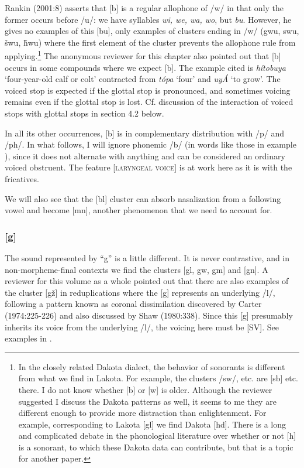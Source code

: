 \documentclass[output=paper]{LSP/langsci}
\begin{document}
Rankin (2001:8) asserts that [b] is a regular allophone of /w/ in that only the former occurs before /u/: we have syllables \textit{wi, we, wa, wo}, but \textit{bu}. However, he gives no examples of this [bu], only examples of clusters ending in /w/ (gwu, swu, \v{s}wu, \v{h}wu) where the first element of the cluster prevents the allophone rule from applying.\footnote{In the closely related Dakota dialect, the behavior of sonorants is different from what we find in Lakota. For example, the clusters /sw/, etc. are [sb] etc. there. I do not know whether [b] or [w] is older. Although the reviewer suggested I discuss the Dakota patterns as well, it seems to me they are different enough to provide more distraction than enlightenment. For example, corresponding to Lakota [gl] we find Dakota [hd]. There is a long and complicated debate in the phonological literature over whether or not [h] is a sonorant, to which these Dakota data can contribute, but that is a topic for another paper.} The anonymous reviewer for this chapter also pointed out that [b] occurs in some compounds where we expect [b]. The example cited is \textit{h\'itobuya} `four-year-old calf or colt' contracted from \textit{t\'opa} `four' and \textit{uy\'A} `to grow'. The voiced stop is expected if the glottal stop is pronounced, and sometimes voicing remains even if the glottal stop is lost. Cf. discussion of the interaction of voiced stops with glottal stops in section 4.2 below.

In all its other occurrences, [b] is in complementary distribution with /p/ and /ph/. In what follows, I will ignore phonemic /b/ (in words like those in example ), since it does not alternate with anything and can be considered an ordinary voiced obstruent. The feature [\textsc{laryngeal voice}] is at work here as it is with the fricatives.

We will also see that the [bl] cluster can absorb nasalization from a following vowel and become [mn], another phenomenon that we need to account for.

\subsubsection{[g]}

The sound represented by ``g'' is a little different. It is never contrastive, and in non-morpheme-final contexts we find the clusters [gl, gw, gm] and [gn]. A reviewer for this volume as a whole pointed out that there are also examples of the cluster [g\v{z}] in reduplications where the [g] represents an underlying /l/, following a pattern known as coronal dissimilation discovered by Carter (1974:225-226) and also discussed by Shaw (1980:338).  Since this [g] presumably inherits its voice from the underlying /l/, the voicing here must be [SV].  See examples in .
\end{document}
